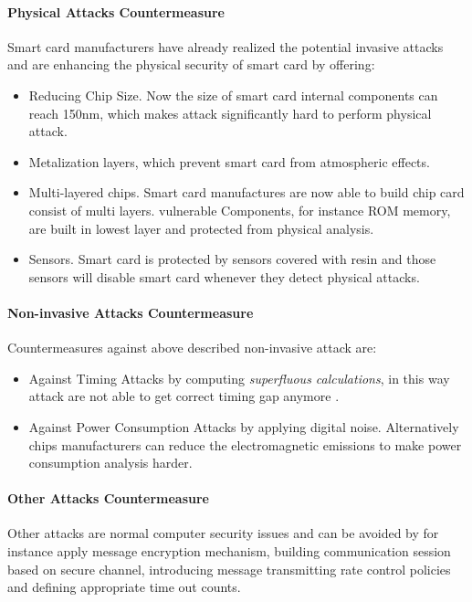 \paragraph{Physical Attacks Countermeasure}
Smart card manufacturers have already realized the potential  invasive attacks and are enhancing the physical security of smart card by offering:
\begin{itemize}
\item Reducing Chip Size. Now the size of smart card internal components can reach 150nm, which makes attack significantly hard to perform physical attack\cite{smart_card_attack3}.
\item Metalization layers, which prevent smart card from atmospheric effects\cite{smart_card_attack3}.
\item Multi-layered chips. Smart card manufactures are now able to build chip card consist of multi layers. vulnerable Components, for instance ROM memory, are built in lowest layer and protected from physical analysis\cite{smart_card_attack3}. 
\item Sensors.  Smart card is protected by sensors covered with resin and those sensors will disable smart card whenever they detect physical attacks\cite{smart_card_attack}.
\end{itemize}
\paragraph{Non-invasive Attacks Countermeasure}
Countermeasures against above described non-invasive attack are:
\begin{itemize}
\item Against Timing Attacks by computing \emph{superfluous calculations}, in this way attack are not  able  to get correct timing gap anymore\cite{smart_card_attack3} .
\item Against Power Consumption Attacks by applying digital noise. Alternatively chips manufacturers can reduce the electromagnetic emissions to make power consumption analysis  harder\cite{smart_card_attack3}.
\end{itemize}
\paragraph{Other Attacks Countermeasure}
Other attacks are normal computer security issues and can be avoided by for instance apply message encryption mechanism, building communication session based on secure channel, introducing message transmitting rate control policies and defining appropriate time out counts.
